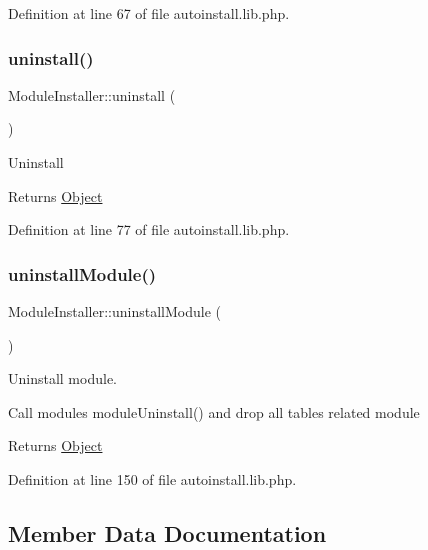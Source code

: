Definition at line 67 of file autoinstall.\+lib.\+php.

\hypertarget{classModuleInstaller_a641ebe46305e7c320eec21a13d7e029f}{}\label{classModuleInstaller_a641ebe46305e7c320eec21a13d7e029f} 
\subsubsection{\texorpdfstring{uninstall()}{uninstall()}}
{\footnotesize\ttfamily Module\+Installer\+::uninstall (\begin{DoxyParamCaption}{ }\end{DoxyParamCaption})}

Uninstall

\begin{DoxyReturn}{Returns}
\hyperlink{classObject}{Object} 
\end{DoxyReturn}


Definition at line 77 of file autoinstall.\+lib.\+php.

\hypertarget{classModuleInstaller_a9ab463e12e9685dc42d4223b86a92754}{}\label{classModuleInstaller_a9ab463e12e9685dc42d4223b86a92754} 
\subsubsection{\texorpdfstring{uninstall\+Module()}{uninstallModule()}}
{\footnotesize\ttfamily Module\+Installer\+::uninstall\+Module (\begin{DoxyParamCaption}{ }\end{DoxyParamCaption})}

Uninstall module.

Call module\textquotesingle{}s module\+Uninstall() and drop all tables related module

\begin{DoxyReturn}{Returns}
\hyperlink{classObject}{Object} 
\end{DoxyReturn}


Definition at line 150 of file autoinstall.\+lib.\+php.



\subsection{Member Data Documentation}
\hypertarget{classModuleInstaller_a292b18d8c31dfa2cbac3bf90520b7128}{}\label{classModuleInstaller_a292b18d8c31dfa2cbac3bf90520b7128} 
